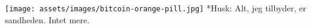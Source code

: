\begin{center}
  \texttt{[image: assets/images/bitcoin-orange-pill.jpg]}
  *{Husk: Alt, jeg tilbyder, er sandheden. Intet mere.}
  \label{fig:bitcoin-orange-pill}
\end{center}

%
%
%
